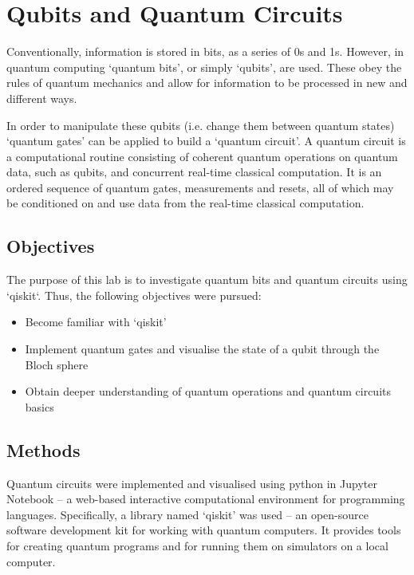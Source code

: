 \renewcommand{\chaptername}{March 8th: Lab}
\chapter{Qubits and Quantum Circuits}


Conventionally, information is stored in bits, as a series of 0s and 1s. However, in quantum computing `quantum bits', or simply `qubits', are used. These obey the rules of quantum mechanics and allow for information to be processed in new and different ways. %

In order to manipulate these qubits (i.e. change them between quantum states) `quantum gates' can be applied to build a `quantum circuit'. A quantum circuit is a computational routine consisting of coherent quantum operations on quantum data, such as qubits, and concurrent real-time classical computation. It is an ordered sequence of quantum gates, measurements and resets, all of which may be conditioned on and use data from the real-time classical computation.

\section{Objectives}
The purpose of this lab is to investigate quantum bits and quantum circuits using `qiskit`. Thus, the following objectives were pursued:
\begin{itemize}
    \item Become familiar with `qiskit'
    \item Implement quantum gates and visualise the state of a qubit through the Bloch sphere
    \item Obtain deeper understanding of quantum operations and quantum circuits basics
\end{itemize}

\section{Methods}
Quantum circuits were implemented and visualised using python in Jupyter Notebook -- a web-based interactive computational environment for programming languages. Specifically, a library named `qiskit' was used -- an open-source software development kit for working with quantum computers. It provides tools for creating quantum programs and for running them on simulators on a local computer. 

